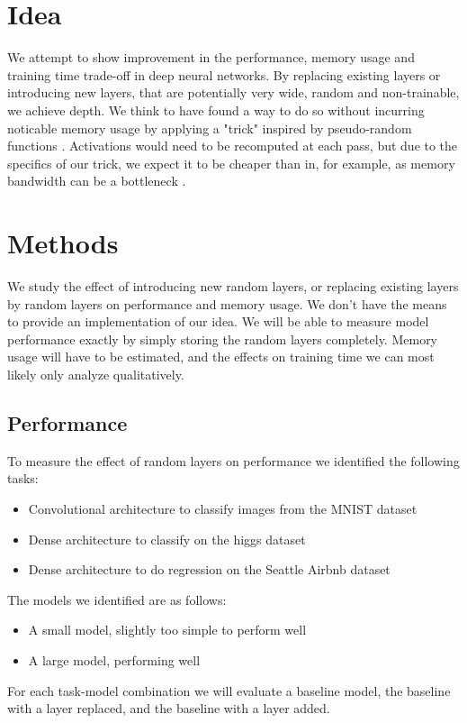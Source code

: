 \documentclass[]{article}
\begin{document}
\begin{multicols}{2}
	\section{Idea}
	We attempt to show improvement in the performance, memory usage and training time trade-off in deep neural networks. By replacing existing layers or introducing new layers, that are potentially very wide, random and non-trainable, we achieve depth. We think to have found a way to do so without incurring noticable memory usage by applying a "trick" inspired by pseudo-random functions \cite{Goldreich_Goldwasser_Micali_1986}. Activations would need to be recomputed at each pass, but due to the specifics of our trick, we expect it to be cheaper than in, for example, \cite{DBLP:journals/corr/GruslysMDLG16} as memory bandwidth can be a bottleneck \cite{Li_Shen_Dou_Ni_Xu_Yang_Wang_Niu_2019}.
	
	\section{Methods}
	We study the effect of introducing new random layers, or replacing existing layers by random layers on performance and memory usage. We don't have the means to provide an implementation of our idea. We will be able to measure model performance exactly by simply storing the random layers completely. Memory usage will have to be estimated, and the effects on training time we can most likely only analyze qualitatively.
	
	\subsection{Performance}
	To measure the effect of random layers on performance we identified the following tasks:
	\begin{itemize}
		\itemsep0em
		\item Convolutional architecture to classify images from the MNIST dataset
		\item Dense architecture to classify on the higgs dataset
		\item Dense architecture to do regression on the Seattle Airbnb dataset
	\end{itemize}
	The models we identified are as follows:
	\begin{itemize}
		\itemsep0em
		\item A small model, slightly too simple to perform well
		\item A large model, performing well
	\end{itemize}
	For each task-model combination we will evaluate a baseline model, the baseline with a layer replaced, and the baseline with a layer added.
	

\end{multicols}
\end{document}
